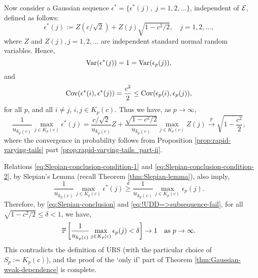 Now consider a Gaussian sequence $\epsilon^* = \{\epsilon^*(j),\;j = 1,2,\ldots\}$, independent of ${\cal E}$, defined as follows:
$$
\epsilon^*(j):= Z \left(c/\sqrt{2}\right) + Z(j) \sqrt{1-{c^2}/{2}}, \quad j = 1, 2, \ldots,
$$ 
where $Z$ and $Z(j), j = 1, 2, \ldots$ are independent standard normal random variables. 
Hence,
\begin{equation} \label{eq:Slepian-conclusion-condition-1}
    {\rm Var}(\epsilon^*(j)) = 1 = {\rm Var}(\epsilon_p(j)),
\end{equation}
and
\begin{equation} \label{eq:Slepian-conclusion-condition-2}
    \cov(\epsilon^*(i),\epsilon^*(j)) = \frac{c^2}{2} \le \cov(\epsilon_p(i),\epsilon_p(j)),
\end{equation}
for all $p$, and all $i\neq j$, $i,j\in K_p(c)$.
Thus we have, as $p\to\infty$, 
\begin{equation} \label{eq:!UDD=>subsequence-fail}
    \frac{1}{u_{k_p(c)}} \max_{j\in K_p(c)} \epsilon^*(j) = \frac{c/\sqrt{2}}{u_{k_p(c)}}Z + \frac{\sqrt{1-c^2/2}}{u_{k_p(c)}} \max_{j\in K_p(c)} Z(j) \stackrel{\mathbb P}{\to} \sqrt{1-\frac{c^2}{2}},
\end{equation}
where the convergence in probability follows from Proposition \ref{prop:rapid-varying-tails} part \ref{prop:rapid-varying-tails_part-ii}.

Relations \eqref{eq:Slepian-conclusion-condition-1} and \eqref{eq:Slepian-conclusion-condition-2}, by Slepian's Lemma (recall
Theorem \ref{thm:Slepian-lemma}), also imply,
\begin{equation}\label{eq:Slepian-conclusion}
  \frac{1}{u_{k_p(c)}} \max_{j\in K_p(c)} \epsilon^*(j) \stackrel{d}{\ge} \frac{1}{u_{k_p(c)}} \max_{j\in K_p(c)} \epsilon_p(j).
\end{equation}
Therefore, by \eqref{eq:Slepian-conclusion} and \eqref{eq:!UDD=>subsequence-fail}, for all $\sqrt{1-c^2/2} \le \delta < 1$, we have,
$$
\P\left[\frac{1}{u_{k_p(c)}} \max_{j\in K_p(c)} \epsilon_p(j) < \delta \right] \to 1 \quad\mbox{as  }p\to\infty.
$$
This contradicts the definition of URS (with the particular choice of $S_p:=K_p(c)$), and the proof of the `only if' part of 
Theorem \ref{thm:Gaussian-weak-dependence} is complete.

